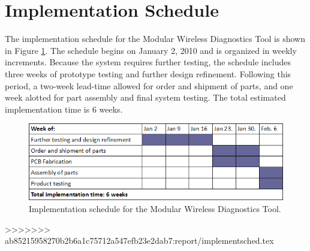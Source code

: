 \section{Implementation Schedule}
The implementation schedule for the Modular Wireless Diagnostics Tool is shown
in Figure \ref{fig:implement sched}. The schedule begins on January 2, 2010 and 
is organized in weekly increments. Because the system requires further testing,
the schedule includes three weeks of prototype testing and further design refinement.
Following this period, a two-week lead-time allowed for order and shipment of parts, 
and one week alotted for part assembly and final system testing. The total estimated
implementation time is 6 weeks.


\begin{figure}[bhp]
\begin{center}
\includegraphics[scale=0.55]{../drawings/implement_sched.png}
\end{center}
\caption[Implementation Schedule]{Implementation schedule for the Modular Wireless
Diagnostics Tool.}
\label{fig:implement sched}
\end{figure}
>>>>>>> ab85215958270b2b6a1c75712a547efb23e2dab7:report/implementsched.tex
